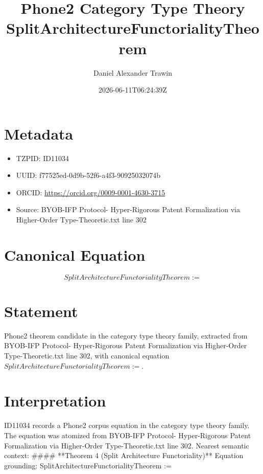 \documentclass[11pt]{article}
\title{Phone2 Category Type Theory SplitArchitectureFunctorialityTheorem}
\author{Daniel Alexander Trawin}
\date{2026-06-11T06:24:39Z}
\begin{document}
\maketitle
\section*{Metadata}
\begin{itemize}
\item TZPID: ID11034
\item UUID: f77525ed-0d9b-52f6-a4f3-90925032074b
\item ORCID: \url{https://orcid.org/0009-0001-4630-3715}
\item Source: BYOB-IFP Protocol- Hyper-Rigorous Patent Formalization via Higher-Order Type-Theoretic.txt line 302
\end{itemize}
\section*{Canonical Equation}
\[
SplitArchitectureFunctorialityTheorem :=
\]
\section*{Statement}
Phone2 theorem candidate in the category type theory family, extracted from BYOB-IFP Protocol- Hyper-Rigorous Patent Formalization via Higher-Order Type-Theoretic.txt line 302, with canonical equation $SplitArchitectureFunctorialityTheorem :=$.
\section*{Interpretation}
ID11034 records a Phone2 corpus equation in the category type theory family. The equation was atomized from BYOB-IFP Protocol- Hyper-Rigorous Patent Formalization via Higher-Order Type-Theoretic.txt line 302. Nearest semantic context: #### **Theorem 4 (Split Architecture Functoriality)** Equation grounding: SplitArchitectureFunctorialityTheorem :=
\end{document}
